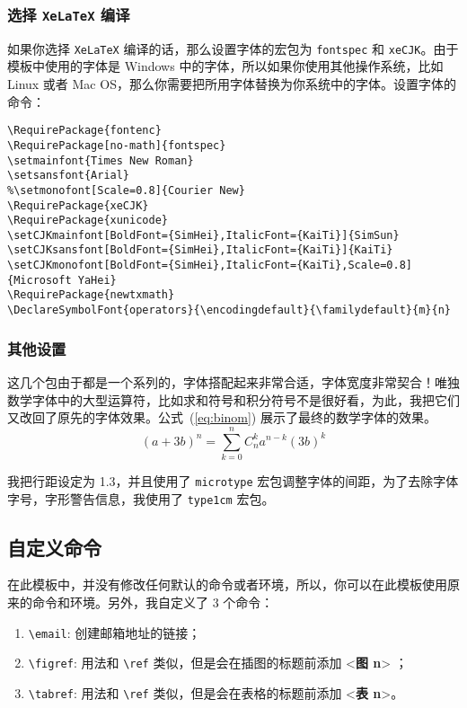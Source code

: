 \documentclass[lang=cn]{elegantpaper}
\begin{document}
\subsubsection{选择 \lstinline{XeLaTeX} 编译}
如果你选择 \lstinline{XeLaTeX} 编译的话，那么设置字体的宏包为 \lstinline{fontspec} 和 \lstinline{xeCJK}。由于模板中使用的字体是 Windows 中的字体，所以如果你使用其他操作系统，比如 Linux 或者 Mac OS，那么你需要把所用字体替换为你系统中的字体。设置字体的命令：

\begin{lstlisting}
\RequirePackage{fontenc}
\RequirePackage[no-math]{fontspec}
\setmainfont{Times New Roman}
\setsansfont{Arial}
%\setmonofont[Scale=0.8]{Courier New}
\RequirePackage{xeCJK}
\RequirePackage{xunicode}
\setCJKmainfont[BoldFont={SimHei},ItalicFont={KaiTi}]{SimSun}
\setCJKsansfont[BoldFont={SimHei},ItalicFont={KaiTi}]{KaiTi}
\setCJKmonofont[BoldFont={SimHei},ItalicFont={KaiTi},Scale=0.8]{Microsoft YaHei}
\RequirePackage{newtxmath}
\DeclareSymbolFont{operators}{\encodingdefault}{\familydefault}{m}{n}
\end{lstlisting}

\subsubsection{其他设置}

这几个包由于都是一个系列的，字体搭配起来非常合适，字体宽度非常契合！唯独数学字体中的大型运算符，比如求和符号和积分符号不是很好看，为此，我把它们又改回了原先的字体效果。公式~(\ref{eq:binom}) 展示了最终的数学字体的效果。
\begin{equation}
(a+3b)^{n} = \sum_{k=0}^{n} C_{n}^{k} a^{n-k} (3b)^k  \label{eq:binom}
\end{equation}

我把行距设定为 1.3，并且使用了 \lstinline{microtype} 宏包调整字体的间距，为了去除字体字号，字形警告信息，我使用了 \lstinline{type1cm} 宏包。


\subsection{自定义命令}
在此模板中，并没有修改任何默认的命令或者环境，所以，你可以在此模板使用原来的命令和环境。另外，我自定义了 3 个命令：

\begin{enumerate}
	\item \lstinline{\email}: 创建邮箱地址的链接；
	\item \lstinline{\figref}: 用法和 \lstinline{\ref} 类似，但是会在插图的标题前添加 <\textbf{图 n}> ；
	\item \lstinline{\tabref}: 用法和 \lstinline{\ref} 类似，但是会在表格的标题前添加 <\textbf{表 n}>。
\end{enumerate}{}
\end{document}
